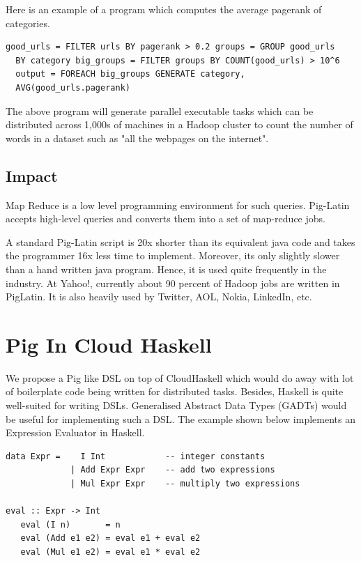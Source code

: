 \documentclass[twoside]{article}
\begin{document}
Here is an example of a program which computes the average pagerank of categories.

\begin{Verbatim}[frame=single]
  good_urls = FILTER urls BY pagerank > 0.2 groups = GROUP good_urls
  BY category big_groups = FILTER groups BY COUNT(good_urls) > 10^6
  output = FOREACH big_groups GENERATE category,
  AVG(good_urls.pagerank)
\end{Verbatim}

The above program will generate parallel executable tasks which can be
distributed across 1,000s of machines in a Hadoop cluster to count the
number of words in a dataset such as "all the webpages on the
internet".

\subsection{Impact}
\label{sec:impact}

Map Reduce is a low level programming environment for such queries.
Pig-Latin accepts high-level queries and converts them into a set of
map-reduce jobs.

A standard Pig-Latin script is 20x shorter than its equivalent java
code and takes the programmer 16x less time to implement. Moreover,
its only slightly slower than a hand written java program. Hence, it
is used quite frequently in the industry. At Yahoo!, currently about
90 percent of Hadoop jobs are written in PigLatin. It is also heavily
used by Twitter, AOL, Nokia, LinkedIn, etc.

\section{Pig In Cloud Haskell}
\label{sec:pig-cloud-haskell}

We propose a Pig like DSL on top of CloudHaskell which would do away
with lot of boilerplate code being written for distributed tasks.
Besides, Haskell is quite well-suited for writing DSLs. Generalised
Abstract Data Types (GADTs) would be useful for implementing such a
DSL.
The example shown below implements an Expression Evaluator in Haskell.

\begin{lstlisting}
data Expr =    I Int            -- integer constants
             | Add Expr Expr    -- add two expressions
             | Mul Expr Expr    -- multiply two expressions

eval :: Expr -> Int
   eval (I n)       = n
   eval (Add e1 e2) = eval e1 + eval e2
   eval (Mul e1 e2) = eval e1 * eval e2
\end{lstlisting}
\end{document}
